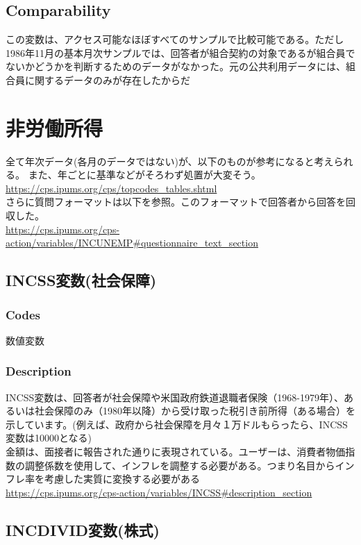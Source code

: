 \documentclass{jsarticle}
\begin{document}
\subsection{Comparability}
この変数は、アクセス可能なほぼすべてのサンプルで比較可能である。ただし1986年11月の基本月次サンプルでは、回答者が組合契約の対象であるが組合員でないかどうかを判断するためのデータがなかった。元の公共利用データには、組合員に関するデータのみが存在したからだ

\section{非労働所得}

全て年次データ(各月のデータではない)が、以下のものが参考になると考えられる。
また、年ごとに基準などがそろわず処置が大変そう。\\
\url{https://cps.ipums.org/cps/topcodes_tables.shtml}\\
  
さらに質問フォーマットは以下を参照。このフォーマットで回答者から回答を回収した。\\
\url{https://cps.ipums.org/cps-action/variables/INCUNEMP#questionnaire_text_section}

\subsection{INCSS変数(社会保障)}

\subsubsection{Codes}
数値変数

\subsubsection{Description}
INCSS変数は、回答者が社会保障や米国政府鉄道退職者保険（1968-1979年）、あるいは社会保障のみ（1980年以降）から受け取った税引き前所得（ある場合）を示しています。(例えば、政府から社会保障を月々１万ドルもらったら、INCSS変数は10000となる)\\
  
金額は、面接者に報告された通りに表現されている。ユーザーは、消費者物価指数の調整係数を使用して、インフレを調整する必要がある。つまり名目からインフレ率を考慮した実質に変換する必要がある\\
\url{https://cps.ipums.org/cps-action/variables/INCSS#description_section}

\subsection{INCDIVID変数(株式)}
\end{document}
